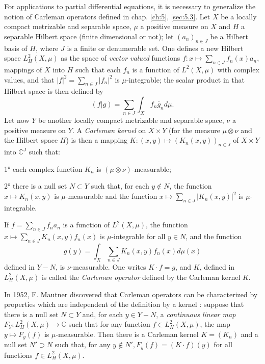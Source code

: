 \documentclass[12pt,a4paper,leqno,twoside]{extbook}
\newcommand{\C}{\mathbb{C}}
\begin{document}
For applications to partial differential equations, it is necessary to generalize the notion of Carleman operators defined in chap. \ref{ch:5}, \ref{sec:5.3}. Let \(X\) be a locally compact metrizable and separable space, \(\mu\) a positive measure on \(X\) and \(H\) a separable Hilbert space (finite dimensional or not); let \((a_n)_{n \in J}\) be a Hilbert basis of \(H\), where \(J\) is a finite or denumerable set. One defines a new Hilbert space \(L^2_H(X,\mu)\) as the space of \emph{vector valued} functions \(f: x \mapsto \sum\limits_{n \in J} f_n(x)a_n\), mappings of \(X\) into \(H\) such that each \(f_n\) is a function of \(L^2(X,\mu)\) with complex values, and that \(|f|^2 = \sum\limits_{n \in J} |f_n|^2\) is \(\mu\)-integrable; the scalar product in that Hilbert space is then defined by
\begin{equation}
    \label{eq:9.8}
    (f|g) = \sum_{n \in J} \int_X f_n \overline{g}_n d\mu.
\end{equation}
Let now \(Y\) be another locally compact metrizable and separable space, \(\nu\) a positive measure on \(Y\). A \emph{Carleman kernel} on \(X \times Y\) (for the measure \(\mu \otimes \nu\) and the Hilbert space \(H\)) is then a mapping \(K: (x,y) \mapsto (K_n(x,y))_{n \in J}\) of \(X \times Y\) into \(\C^J\) such that:

1° each complex function \(K_n\) is \((\mu \otimes \nu)\)-measurable;

2° there is a null set \(N \subset Y\) such that, for each \(y \not\in N\), the function \(x \mapsto K_n(x,y)\) is \(\mu\)-measurable and the function \(x \mapsto \sum\limits_{n \in J} |K_n(x, y)|^2\) is \(\mu\)-integrable.

If \(f = \sum\limits_{n \in J} f_n a_n\) is a function of \(L^2(X,\mu)\), the function \(x \mapsto \sum\limits_{n \in J} K_n(x,y) f_n(x)\) is \(\mu\)-integrable for all \(y \in N\), and the function
\begin{equation}
    \label{eq:9.9}
    g(y) = \int_X \sum_{n \in J} K_n(x, y) f_n(x) d\mu(x)
\end{equation}
defined in \(Y-N\), is \(\nu\)-measurable. One writes \(K \cdot f = g\), and \(K\), defined in \(L^2_H(X,\mu)\) is called the \emph{Carleman operator} defined by the Carleman kernel \(K\).

In 1952, F. Mautner discovered that Carleman operators can be characterized by properties which are independent of the definition by a kernel \cite{157}: suppose that there is a null set \(N \subset Y\) and, for each \(y \in Y - N\), a \emph{continuous linear map} \(F_Y: L_H^2(X, \mu) \to \C\) such that for any function \(f \in L^2_H(X,\mu)\), the map \(y \mapsto F_y(f)\) is \(\mu\)-measurable. Then there is a Carleman kernel \(K = (K_n)\) and a null set \(N' \supset N\) such that, for any \(y \not\in N', F_y(f) = (K \cdot f)(y)\) for all functions \(f \in L^2_H(X,\mu)\).
\end{document}
